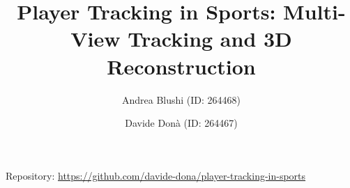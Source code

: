 \documentclass{llncs}
\begin{document}

\title{Player Tracking in Sports: Multi-View Tracking and 3D Reconstruction}
\author{Andrea Blushi (ID: 264468) \and Davide Don\`{a} (ID: 264467)}
\maketitle
\begin{center}
	\small Repository: \url{https://github.com/davide-dona/player-tracking-in-sports}
\end{center}







\newpage




\end{document}
